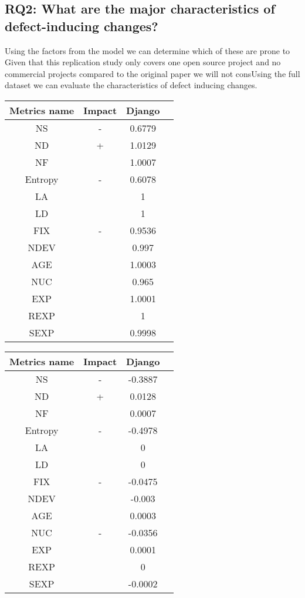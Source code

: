 \documentclass[10pt, conference]{IEEEtran}
\begin{document}
\subsection{RQ2: What are the major characteristics of defect-inducing changes?}
\label{sec:rq2}

Using the factors from the model we can determine which of these are prone to Given that this replication study only covers one open source project and no commercial projects compared to the original paper we will not consUsing the full dataset we can evaluate the characteristics of defect inducing changes. 

\begin{table}
	\begin{tabular}{|c|c|c|c|}
		\hline Metrics name & Impact & Django \\ 
		\hline NS & - & 0.6779 \\ 
		\hline ND & + & 1.0129 \\ 
		\hline NF &  & 1.0007 \\ 
		\hline Entropy & - & 0.6078 \\ 
		\hline LA &  & 1 \\ 
		\hline LD &  & 1 \\ 
		\hline FIX & - & 0.9536 \\ 
		\hline NDEV &  & 0.997 \\ 
		\hline AGE &  & 1.0003 \\ 
		\hline NUC &  & 0.965 \\ 
		\hline EXP &  & 1.0001 \\ 
		\hline REXP &  & 1 \\ 
		\hline SEXP &  & 0.9998 \\ 
		\hline 
	\end{tabular}
	\label{table:odds_ratio}  
\end{table}


\begin{table}
	\begin{tabular}{|c|c|c|c|}
		\hline Metrics name & Impact & Django \\ 
		\hline NS & - & -0.3887 \\ 
		\hline ND & + & 0.0128 \\ 
		\hline NF &  & 0.0007 \\ 
		\hline Entropy & - & -0.4978 \\ 
		\hline LA &  & 0 \\ 
		\hline LD &  & 0 \\ 
		\hline FIX & - & -0.0475 \\ 
		\hline NDEV &  & -0.003 \\ 
		\hline AGE &  & 0.0003 \\ 
		\hline NUC & - & -0.0356 \\ 
		\hline EXP &  & 0.0001 \\ 
		\hline REXP &  & 0 \\ 
		\hline SEXP &  & -0.0002 \\ 
		\hline 
	\end{tabular}
	\label{table:regression_coefficients} 
\end{table}
\end{document}
